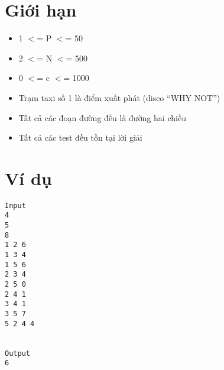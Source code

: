 \section{   Giới hạn  }
\begin{itemize}
	\item     1 $<$= P $<$= 50   
	\item     2 $<$= N $<$= 500   
	\item     0 $<$= c $<$= 1000   
	\item     Trạm taxi số 1 là điểm xuất phát (disco “WHY NOT”)   
	\item     Tất cả các đoạn đường đều là đường hai chiều   
	\item     Tất cả các test đều tồn tại lời giải   
\end{itemize}

\section{   Ví dụ  }
\begin{verbatim}
Input
4
5
8
1 2 6
1 3 4
1 5 6
2 3 4
2 5 0
2 4 1
3 4 1
3 5 7
5 2 4 4


Output
6
\end{verbatim}